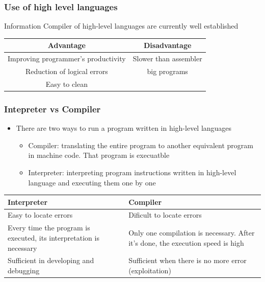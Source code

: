 \documentclass{beamer}
\begin{document}
\begin{frame}
\frametitle{Use of high level languages}
\begin{block}{Information}
Compiler of high-level languages are currently well established
\end{block}
\begin{table}
\begin{tabular}{|c|c|}
\hline
Advantage & Disadvantage\\
\hline
Improving programmer's productivity& Slower than assembler\\
\hline
Reduction of logical errors& big programs\\
\hline
Easy to clean &\\
\hline
\end{tabular}
\end{table}
\end{frame}
\begin{frame}
\frametitle{Intepreter vs Compiler}
\begin{itemize}
\item There are two ways to run a program written in high-level languages
\begin{itemize}
\item Compiler: translating the entire program to another equivalent program in machine code. That program is execuatble
\item Interpreter: interpreting program instructions written in high-level language and executing them one by one
\end{itemize}
\end{itemize}

\begin{table}
\begin{tabular}{|p{5cm}|p{5cm}|}
\hline
Interpreter & Compiler \\
\hline
Easy to locate errors&Dificult to locate errors\\
\hline
Every time the program is executed, its interpretation is necessary& Only one compilation is necessary. After it's done, the execution speed is high\\
\hline
Sufficient in developing and debugging& Sufficient when there is no more error (exploitation)\\
\hline
\end{tabular}
\end{table}
\end{frame}
\end{document}
